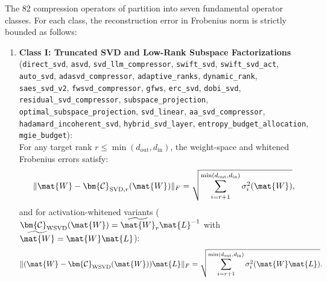 \begin{theorem}
\label{thm:taxonomic_compressor_bounds}
The 82 compression operators of \neuralops{} partition into seven fundamental operator classes. For each class, the reconstruction error in Frobenius norm is strictly bounded as follows:

\begin{enumerate}
    \item \textbf{Class I: Truncated SVD and Low-Rank Subspace Factorizations} \\
    (\texttt{direct\_svd}, \texttt{asvd}, \texttt{svd\_llm\_compressor}, \texttt{swift\_svd}, \texttt{swift\_svd\_act}, \texttt{auto\_svd}, \texttt{adasvd\_compressor}, \texttt{adaptive\_ranks}, \texttt{dynamic\_rank}, \texttt{saes\_svd\_v2}, \texttt{fwsvd\_compressor}, \texttt{gfws}, \texttt{erc\_svd}, \texttt{dobi\_svd}, \texttt{residual\_svd\_compressor}, \texttt{subspace\_projection}, \texttt{optimal\_subspace\_projection}, \texttt{svd\_linear}, \texttt{aa\_svd\_compressor}, \texttt{hadamard\_incoherent\_svd}, \texttt{hybrid\_svd\_layer}, \texttt{entropy\_budget\_allocation}, \texttt{mgie\_budget}): \\
    For any target rank $r \le \min(d_{\text{out}}, d_{\text{in}})$, the weight-space and whitened Frobenius errors satisfy:
    \begin{equation}
    \|\mat{W} - \bm{\mathcal{C}}_{\text{SVD}, r}(\mat{W})\|_F = \sqrt{\sum_{i=r+1}^{\min(d_{\text{out}}, d_{\text{in}})} \sigma_i^2(\mat{W})},
    \label{eq:bound_class1_svd}
    \end{equation}
    and for activation-whitened variants ($\bm{\mathcal{C}}_{\text{WSVD}}(\mat{W}) = \widetilde{\mat{W}}_r \mat{L}^{-1}$ with $\widetilde{\mat{W}} = \mat{W}\mat{L}$):
    \begin{equation}
    \|(\mat{W} - \bm{\mathcal{C}}_{\text{WSVD}}(\mat{W}))\mat{L}\|_F = \sqrt{\sum_{i=r+1}^{\min(d_{\text{out}}, d_{\text{in}})} \sigma_i^2(\mat{W}\mat{L})}.
    \label{eq:bound_class1_whitened}
    \end{equation}


\end{enumerate}
\end{theorem}
